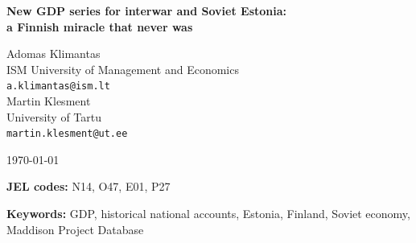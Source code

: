 \documentclass[12pt,a4paper]{article}
\begin{document}

\begin{titlepage}
    \centering
    \vspace*{2cm}
    {\large\bfseries New GDP series for interwar and Soviet Estonia:\\
    a Finnish miracle that never was\par}
    \vspace{1.5cm}
    {\normalsize
    Adomas Klimantas\\
    ISM University of Management and Economics\\
    \texttt{a.klimantas@ism.lt}\\[0.8em]
    Martin Klesment\\
    University of Tartu\\
    \texttt{martin.klesment@ut.ee}
    \par}
    \vspace{1.5cm}
    {\small\today\par}
    \vspace{1.5cm}
    \begin{abstract}
        \noindent
        This paper constructs the first internationally comparable annual series of Estonian GDP per capita for 1919--95 and splices it to existing estimates to give an unbroken series for 1913 and 1919--2022 in 1990 and 2011 international dollars, ready for the Maddison Project Database. The reconstruction proceeds in three steps: a new 1938 benchmark based on a bilateral price comparison with Sweden; a recalculated and extended production-side series for 1919--40; and a new series for the Estonian SSR for 1937--95, built from physical output and employment series drawn from Soviet yearbooks and the Estonian archives and anchored to Bolotin's 1990 benchmark. Independently constructed series agree within 4 per cent where they overlap in 1937--40, and within 1 per cent at the 1991 splice. Estonia grew by  per cent a year in the 1920s and  per cent in the 1930s, by  per cent a year in 1950--68 and by  per cent in 1968--89; the transition cut income per head by a third. Estonia stood at  per cent of Finnish income per head in 1919 but at only  per cent in 1938: almost half of the gap that separated the two countries in 1989 had opened before Soviet occupation. Finland is a revealing comparator for Estonia, but not a measure of what Estonia lost.
    \end{abstract}
    \vspace{0.8cm}
    {\small\textbf{JEL codes:} N14, O47, E01, P27\par}
    {\small\textbf{Keywords:} GDP, historical national accounts, Estonia, Finland, Soviet economy,
    Maddison Project Database\par}
\end{titlepage}
\end{document}
